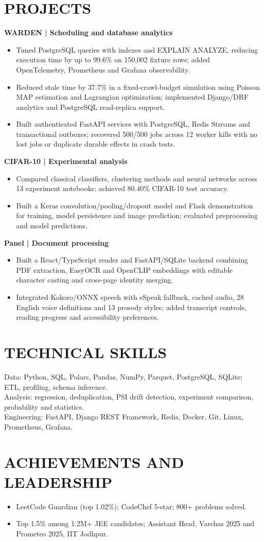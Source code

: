 \documentclass[10pt,a4paper]{article}
\begin{document}
\section*{PROJECTS}
\textbf{WARDEN | Scheduling and database analytics}
\begin{itemize}
\item Tuned PostgreSQL queries with indexes and EXPLAIN ANALYZE, reducing execution time by up to 99.6\% on 150,002 fixture rows; added OpenTelemetry, Prometheus and Grafana observability.
\item Reduced stale time by 37.7\% in a fixed-crawl-budget simulation using Poisson MAP estimation and Lagrangian optimization; implemented Django/DRF analytics and PostgreSQL read-replica support.
\item Built authenticated FastAPI services with PostgreSQL, Redis Streams and transactional outboxes; recovered 500/500 jobs across 12 worker kills with no lost jobs or duplicate durable effects in crash tests.
\end{itemize}
\textbf{CIFAR-10 | Experimental analysis}
\begin{itemize}
\item Compared classical classifiers, clustering methods and neural networks across 13 experiment notebooks; achieved 80.40\% CIFAR-10 test accuracy.
\item Built a Keras convolution/pooling/dropout model and Flask demonstration for training, model persistence and image prediction; evaluated preprocessing and model predictions.
\end{itemize}
\textbf{Panel | Document processing}
\begin{itemize}
\item Built a React/TypeScript reader and FastAPI/SQLite backend combining PDF extraction, EasyOCR and OpenCLIP embeddings with editable character casting and cross-page identity merging.
\item Integrated Kokoro/ONNX speech with eSpeak fallback, cached audio, 28 English voice definitions and 13 prosody styles; added transcript controls, reading progress and accessibility preferences.
\end{itemize}
\section*{TECHNICAL SKILLS}
Data: Python, SQL, Polars, Pandas, NumPy, Parquet, PostgreSQL, SQLite; ETL, profiling, schema inference.\\[2pt]
Analysis: regression, deduplication, PSI drift detection, experiment comparison, probability and statistics.\\[2pt]
Engineering: FastAPI, Django REST Framework, Redis, Docker, Git, Linux, Prometheus, Grafana.
\section*{ACHIEVEMENTS AND LEADERSHIP}
\begin{itemize}
\item LeetCode Guardian (top 1.02\%); CodeChef 5-star; 800+ problems solved.
\item Top 1.5\% among 1.2M+ JEE candidates; Assistant Head, Varchas 2025 and Prometeo 2025, IIT Jodhpur.
\end{itemize}
\end{document}
